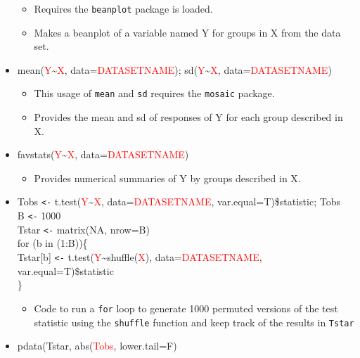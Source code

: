 \documentclass[]{book}
\providecommand{\tightlist}{%
  \setlength{\itemsep}{0pt}\setlength{\parskip}{0pt}}
\theoremstyle{definition}
\theoremstyle{definition}
\theoremstyle{remark}
\begin{document}
\begin{itemize}
  \begin{itemize}
  \item
    Requires the \texttt{beanplot} package is loaded.
  \item
    Makes a beanplot of a variable named Y for groups in X from the data
    set.
  \end{itemize}
\item
  mean(\textcolor{red}{Y}\textasciitilde{}\textcolor{red}{X},
  data=\textcolor{red}{DATASETNAME});
  sd(\textcolor{red}{Y}\textasciitilde{}\textcolor{red}{X},
  data=\textcolor{red}{DATASETNAME})

  \begin{itemize}
  \item
    This usage of \texttt{mean} and \texttt{sd} requires the
    \texttt{mosaic} package.
  \item
    Provides the mean and sd of responses of Y for each group described
    in X.
  \end{itemize}
\item
  favstats(\textcolor{red}{Y}\textasciitilde{}\textcolor{red}{X},
  data=\textcolor{red}{DATASETNAME})

  \begin{itemize}
  \tightlist
  \item
    Provides numerical summaries of Y by groups described in X.
  \end{itemize}
\item
  Tobs \texttt{\textless{}-}
  t.test(\textcolor{red}{Y}\textasciitilde{}\textcolor{red}{X},
  data=\textcolor{red}{DATASETNAME}, var.equal=T)\$statistic; Tobs\\
  B \texttt{\textless{}-} 1000\\
  Tstar \texttt{\textless{}-} matrix(NA, nrow=B)\\
  for (b in (1:B))\{\\
  Tstar{[}b{]} \texttt{\textless{}-}
  t.test(\textcolor{red}{Y}\textasciitilde{}shuffle(\textcolor{red}{X}),
  data=\textcolor{red}{DATASETNAME}, var.equal=T)\$statistic\\
  \}

  \begin{itemize}
  \tightlist
  \item
    Code to run a \texttt{for} loop to generate 1000 permuted versions
    of the test statistic using the \texttt{shuffle} function and keep
    track of the results in \texttt{Tstar}
  \end{itemize}
\item
  pdata(Tstar, abs(\textcolor{red}{Tobs}, lower.tail=F)


\end{itemize}
\end{document}
